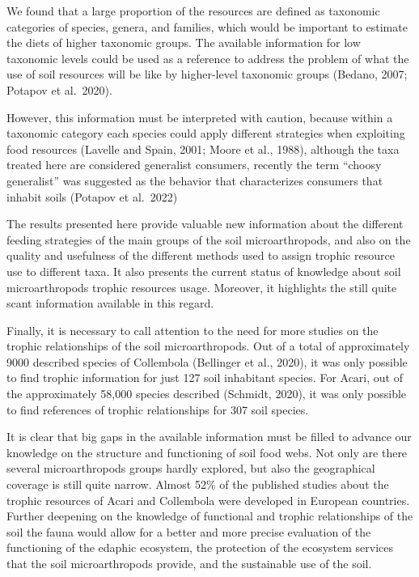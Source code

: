 \documentclass[11pt]{article}
\begin{document}
We found that a large proportion of the resources are defined as
taxonomic categories of species, genera, and families, which would be
important to estimate the diets of higher taxonomic groups. The
available information for low taxonomic levels could be used as a
reference to address the problem of what the use of soil resources will
be like by higher-level taxonomic groups (Bedano, 2007; Potapov et
al.~2020).

However, this information must be interpreted with caution, because
within a taxonomic category each species could apply different
strategies when exploiting food resources (Lavelle and Spain, 2001;
Moore et al., 1988), although the taxa treated here are considered
generalist consumers, recently the term ``choosy generalist'' was
suggested as the behavior that characterizes consumers that inhabit
soils (Potapov et al.~2022)

The results presented here provide valuable new information about the
different feeding strategies of the main groups of the soil
microarthropods, and also on the quality and usefulness of the different
methods used to assign trophic resource use to different taxa. It also
presents the current status of knowledge about soil microarthropods
trophic resources usage. Moreover, it highlights the still quite scant
information available in this regard.

Finally, it is necessary to call attention to the need for more studies
on the trophic relationships of the soil microarthropods. Out of a total
of approximately 9000 described species of Collembola (Bellinger et al.,
2020), it was only possible to find trophic information for just 127
soil inhabitant species. For Acari, out of the approximately 58,000
species described (Schmidt, 2020), it was only possible to find
references of trophic relationships for 307 soil species.

It is clear that big gaps in the available information must be filled to
advance our knowledge on the structure and functioning of soil food
webs. Not only are there several microarthropods groups hardly explored,
but also the geographical coverage is still quite narrow. Almost 52\% of
the published studies about the trophic resources of Acari and
Collembola were developed in European countries. Further deepening on
the knowledge of functional and trophic relationships of the soil the
fauna would allow for a better and more precise evaluation of the
functioning of the edaphic ecosystem, the protection of the ecosystem
services that the soil microarthropods provide, and the sustainable use
of the soil.
\end{document}
